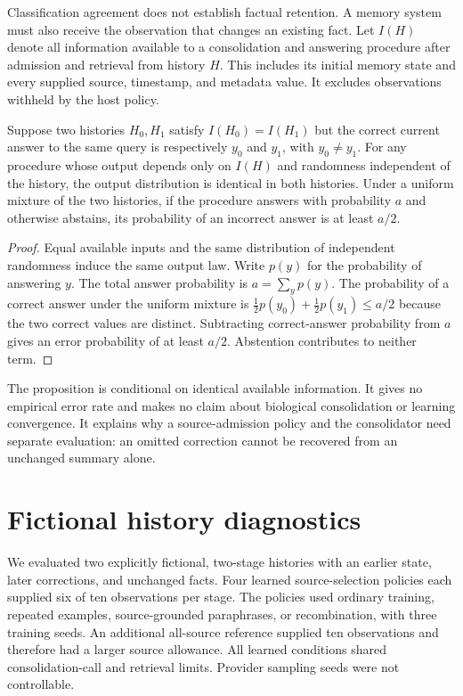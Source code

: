 Classification agreement does not establish factual retention. A memory system
must also receive the observation that changes an existing fact. Let $I(H)$
denote all information available to a consolidation and answering procedure
after admission and retrieval from history $H$. This includes its initial
memory state and every supplied source, timestamp, and metadata value. It
excludes observations withheld by the host policy.

\begin{samepage}
\begin{proposition}
Suppose two histories $H_0,H_1$ satisfy $I(H_0)=I(H_1)$ but the correct current
answer to the same query is respectively $y_0$ and $y_1$, with $y_0\ne y_1$.
For any procedure whose output depends only on $I(H)$ and randomness independent
of the history, the output distribution is identical in both histories.
Under a uniform mixture of the two histories, if the procedure answers with
probability $a$ and otherwise abstains, its probability of an incorrect answer
is at least $a/2$.
\end{proposition}

\begin{proof}
Equal available inputs and the same distribution of independent randomness
induce the same output law. Write $p(y)$ for the probability of answering $y$.
The total answer probability is $a=\sum_y p(y)$. The probability of a correct
answer under the uniform mixture is
$\tfrac12 p(y_0)+\tfrac12 p(y_1)\leq a/2$ because the two correct values are
distinct. Subtracting correct-answer probability from $a$ gives an error
probability of at least $a/2$. Abstention contributes to neither term.
\end{proof}
\end{samepage}

The proposition is conditional on identical available information. It gives no
empirical error rate and makes no claim about biological consolidation or
learning convergence. It explains why a source-admission policy and the
consolidator need separate evaluation: an omitted correction cannot be recovered
from an unchanged summary alone.

\section{Fictional history diagnostics}

We evaluated two explicitly fictional, two-stage histories with an earlier
state, later corrections, and unchanged facts. Four learned source-selection
policies each supplied six of ten observations per stage. The policies used
ordinary training, repeated examples, source-grounded paraphrases, or
recombination, with three training seeds. An additional all-source reference
supplied ten observations and therefore had a larger source allowance. All
learned conditions shared consolidation-call and retrieval limits. Provider
sampling seeds were not controllable.

